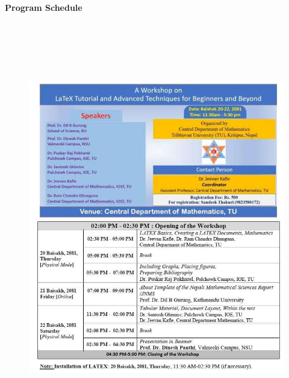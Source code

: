 \documentclass[a4paper,12pt]{report}
\begin{document}
\vspace{15mm}
{\Large \textbf{Program Schedule}}\\
\begin{figure}[h!]
  \centering
  \includegraphics[width=17cm, height=18cm]{schedule.jpg}
\end{figure}
\clearpage
\end{document}
